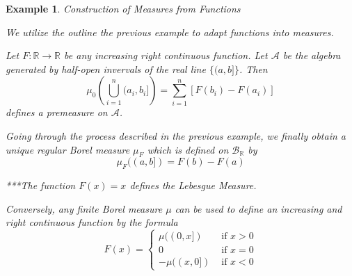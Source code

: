 \documentclass[12pt]{Qual}
\newtheorem{example}{Example}
\begin{document}
\vspace{0.5cm}
\begin{example}{\Large\textit{Construction of Measures from Functions}}

We utilize the outline the previous example to adapt functions into measures.

Let $F:\mathbb{R}\to\mathbb{R}$ be any increasing right continuous function. Let $\mathscr{A}$ be the algebra generated by half-open invervals of the real line $\{(a,b]\}$. Then $$\mu_0\left(\bigcup_{i=1}^n(a_i,b_i]\right)=\sum_{i=1}^n[F(b_i)-F(a_i)]$$ defines a premeasure on $\mathscr{A}$.

Going through the process described in the previous example, we finally obtain a \textit{unique} regular Borel measure $\mu_F$ which is defined on $\mathscr{B}_\mathbb{R}$ by $$\mu_F((a,b])=F(b)-F(a)$$

***The function $F(x)=x$ defines the Lebesgue Measure.

Conversely, any finite Borel measure $\mu$ can be used to define an increasing and right continuous function by the formula $$F(x)=\begin{cases}
\mu((0,x]) & \text{ if } x>0\\
0 & \text{ if } x=0\\
-\mu((x,0]) & \text{ if } x<0
\end{cases}$$
\end{example}
\vspace{0.5cm}

\newpage
\end{document}
